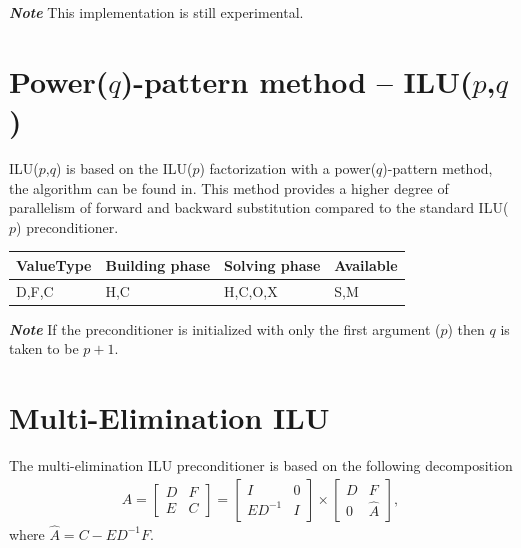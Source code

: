 

\textbf{\emph{Note}} This implementation is still experimental.

\section{Power($q$)-pattern method -- ILU($p$,$q$)}

ILU($p$,$q$) is based on the ILU($p$) factorization with a power($q$)-pattern method, the algorithm can be found in\cite{Lukarski2012}. This method provides a higher degree of parallelism of forward and backward substitution compared to the standard ILU($p$) preconditioner.

\begin{table}[H]
\begin{tabular}{l|l|l|l}
\multicolumn{1}{c|}{ValueType} & Building phase & Solving phase & Available \\ \hline
D,F,C                          & H,C            & H,C,O,X       & S,M      
\end{tabular}
\end{table}

\textbf{\emph{Note}} If the preconditioner is initialized with only the first argument ($p$) then $q$ is taken to be $p+1$. 



\section{Multi-Elimination ILU}

The multi-elimination ILU preconditioner is based on the following decomposition
\begin{eqnarray}
A =\left[
\begin{array}{cc}  
D & F \\ 
E & C 
\end{array}\right]
= \left[
\begin{array}{cc}  
I & 0 \\ 
E D^{-1} & I 
\end{array}\right]
\times \left[
\begin{array}{cc}  
D & F \\ 
0 & \hat{A}
\end{array}\right],
\end{eqnarray}
where $\hat{A}=C - E D^{-1} F$.\\


